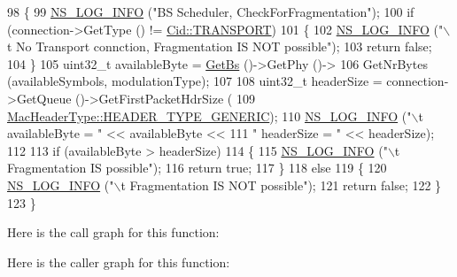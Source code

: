 \begin{DoxyCode}
98 \{
99   \hyperlink{group__logging_gafbd73ee2cf9f26b319f49086d8e860fb}{NS\_LOG\_INFO} (\textcolor{stringliteral}{"BS Scheduler, CheckForFragmentation"});
100   \textcolor{keywordflow}{if} (connection->GetType () != \hyperlink{classns3_1_1Cid_a10b8f92080ca5790e65a0bfa2f557e0aa46fbed56841c3bf471aa84de022edf87}{Cid::TRANSPORT})
101     \{
102       \hyperlink{group__logging_gafbd73ee2cf9f26b319f49086d8e860fb}{NS\_LOG\_INFO} (\textcolor{stringliteral}{"\(\backslash\)t No Transport connction, Fragmentation IS NOT possible"});
103       \textcolor{keywordflow}{return} \textcolor{keyword}{false};
104     \}
105   uint32\_t availableByte = \hyperlink{classns3_1_1BSScheduler_a8b09065ac8f74cb35446af55128e41c7}{GetBs} ()->GetPhy ()->
106     GetNrBytes (availableSymbols, modulationType);
107 
108   uint32\_t headerSize = connection->GetQueue ()->GetFirstPacketHdrSize (
109       \hyperlink{classns3_1_1MacHeaderType_a54d8fc8bc93a2b7865627965cdd31c20a48fe5b2f20cadf78008c71469b518403}{MacHeaderType::HEADER\_TYPE\_GENERIC});
110   \hyperlink{group__logging_gafbd73ee2cf9f26b319f49086d8e860fb}{NS\_LOG\_INFO} (\textcolor{stringliteral}{"\(\backslash\)t availableByte = "} << availableByte <<
111                \textcolor{stringliteral}{" headerSize = "} << headerSize);
112 
113   \textcolor{keywordflow}{if} (availableByte > headerSize)
114     \{
115       \hyperlink{group__logging_gafbd73ee2cf9f26b319f49086d8e860fb}{NS\_LOG\_INFO} (\textcolor{stringliteral}{"\(\backslash\)t Fragmentation IS possible"});
116       \textcolor{keywordflow}{return} \textcolor{keyword}{true};
117     \}
118   \textcolor{keywordflow}{else}
119     \{
120       \hyperlink{group__logging_gafbd73ee2cf9f26b319f49086d8e860fb}{NS\_LOG\_INFO} (\textcolor{stringliteral}{"\(\backslash\)t Fragmentation IS NOT possible"});
121       \textcolor{keywordflow}{return} \textcolor{keyword}{false};
122     \}
123 \}
\end{DoxyCode}


Here is the call graph for this function\+:




Here is the caller graph for this function\+:


